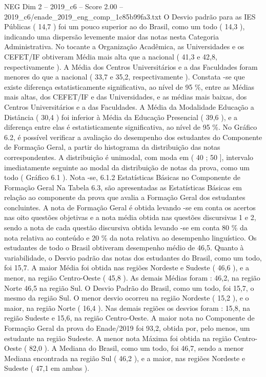 \begin{textsample}{NEG Dim 2 – 2019\_c6 – Score 2.00 – 2019\_c6/enade\_2019\_eng\_comp\_1c85b99fa3.txt}
O Desvio padrão para as IES Públicas ( 14,7 ) foi um pouco superior ao do Brasil, como um todo ( 14,3 ), indicando uma dispersão levemente maior das notas nesta Categoria Administrativa.
No tocante a Organização Acadêmica, as Universidades e os CEFET/IF obtiveram Média mais alta que a nacional ( 41,3 e 42,8, respectivamente ).
A Média dos Centros Universitários e a das Faculdades foram menores do que a nacional ( 33,7 e 35,2, respectivamente ).
Constata -se que existe diferença estatisticamente significativa, ao nível de 95 \%, entre as Médias mais altas, dos CEFET/IF e das Universidades, e as médias mais baixas, dos Centros Universitários e a das Faculdades.
A Média da Modalidade Educação a Distância ( 30,4 ) foi inferior à Média da Educação Presencial ( 39,6 ), e a diferença entre elas é estatisticamente significativa, ao nível de 95 \%.
No Gráfico 6.2, é possível verificar a avaliação do desempenho dos estudantes do Componente de Formação Geral, a partir do histograma da distribuição das notas correspondentes.
A distribuição é unimodal, com moda em ( 40 ; 50 ], intervalo imediatamente seguinte ao modal da distribuição de notas da prova, como um todo ( Gráfico 6.1 ).
Nota -se, 6.1.2 Estatísticas Básicas no Componente de Formação Geral Na Tabela 6.3, são apresentadas as Estatísticas Básicas em relação ao componente da prova que avalia a Formação Geral dos estudantes concluintes.
A nota de Formação Geral é obtida levando -se em conta os acertos nas oito questões objetivas e a nota média obtida nas questões discursivas 1 e 2, sendo a nota de cada questão discursiva obtida levando -se em conta 80 \% da nota relativa ao conteúdo e 20 \% da nota relativa ao desempenho linguístico.
Os estudantes de todo o Brasil obtiveram desempenho médio de 46,5.
Quanto à variabilidade, o Desvio padrão das notas dos estudantes do Brasil, como um todo, foi 15,7.
A maior Média foi obtida nas regiões Nordeste e Sudeste ( 46,6 ), e a menor, na região Centro-Oeste ( 45,8 ).
As demais Médias foram : 46,2, na região Norte 46,5 na região Sul.
O Desvio Padrão do Brasil, como um todo, foi 15,7, o mesmo da região Sul.
O menor desvio ocorreu na região Nordeste ( 15,2 ), e o maior, na região Norte ( 16,4 ).
Nas demais regiões os desvios foram : 15,8, na região Sudeste e 15,6, na região Centro-Oeste.
A maior nota no Componente de Formação Geral da prova do Enade/2019 foi 93,2, obtida por, pelo menos, um estudante na região Sudeste.
A menor nota Máxima foi obtida na região Centro-Oeste ( 82,0 ).
A Mediana do Brasil, como um todo, foi 46,7, sendo a menor Mediana encontrada na região Sul ( 46,2 ), e a maior, nas regiões Nordeste e Sudeste ( 47,1 em ambas ).

\end{textsample}
